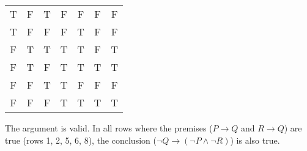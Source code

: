 \documentclass{article}
\begin{document}
\begin{enumerate}
\begin{center}
\begin{tabular}{c|c|c|c|c|c|c}
                        T   & F   & T   & F         & F         & F                     & F                                  \\
                        T   & F   & F   & F         & T         & F                     & F                                  \\
                        F   & T   & T   & T         & T         & F                     & T                                  \\
                        F   & T   & F   & T         & T         & T                     & T                                  \\
                        F   & F   & T   & T         & F         & F                     & F                                  \\
                        F   & F   & F   & T         & T         & T                     & T                                  \\
                  \end{tabular}
            \end{center}
            The argument is valid. In all rows where the premises ($P \to Q$ and $R \to Q$) are true (rows 1, 2, 5, 6, 8), the conclusion ($\neg Q \to (\neg P \land \neg R)$) is also true.
\end{enumerate}
\end{document}
